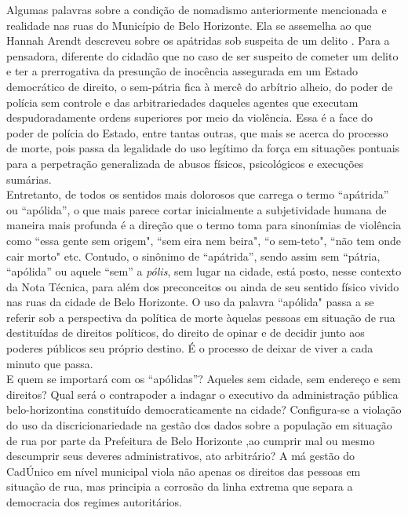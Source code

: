 \documentclass[12pt]{article}
\begin{document}
Algumas palavras sobre a condição de nomadismo anteriormente mencionada e realidade nas ruas do Município de Belo Horizonte. Ela se assemelha ao que Hannah Arendt descreveu sobre os apátridas sob suspeita de um delito \citep[p.~295]{apatrida}. Para a pensadora, diferente do cidadão que no caso de ser suspeito de cometer um delito e ter a prerrogativa da presunção de inocência assegurada em um Estado democrático de direito, o sem-pátria fica à mercê do arbítrio alheio, do poder de polícia sem controle e das arbitrariedades daqueles agentes que executam despudoradamente ordens superiores por meio da violência. Essa é a face do poder de polícia do Estado, entre tantas outras, que mais se acerca do processo de morte, pois passa da legalidade do uso legítimo da força em situações pontuais para a perpetração generalizada de abusos físicos, psicológicos e execuções sumárias.\\

Entretanto, de todos os sentidos mais dolorosos que carrega o termo ``apátrida” ou ``apólida”, o que mais parece cortar inicialmente a subjetividade humana de maneira mais profunda é a direção que o termo toma para sinonímias de violência como ``essa gente sem origem", ``sem eira nem beira", ``o sem-teto", ``não tem onde cair morto" etc. Contudo, o sinônimo de ``apátrida”, sendo assim sem ``pátria, ``apólida” ou aquele ``sem” a \emph{pólis}, sem lugar na cidade, está posto, nesse contexto da Nota Técnica, para além dos preconceitos ou ainda de seu sentido físico vivido nas ruas da cidade de Belo Horizonte. O uso da palavra ``apólida" passa a se referir sob a perspectiva da política de morte àquelas pessoas em situação de rua destituídas de direitos políticos, do direito de opinar e de decidir junto aos poderes públicos seu próprio destino. É o processo de deixar de viver a cada minuto que passa.\\ 

E quem se importará com os ``apólidas”? Aqueles sem cidade, sem endereço e sem direitos? Qual será o contrapoder a indagar o executivo da administração pública belo-horizontina constituído democraticamente na cidade? Configura-se a violação do uso da discricionariedade na gestão dos dados sobre a população em situação de rua por parte da Prefeitura de Belo Horizonte ,ao cumprir mal ou mesmo descumprir seus deveres administrativos, ato arbitrário? A má gestão do CadÚnico em nível municipal viola não apenas os direitos das pessoas em situação de rua, mas principia a corrosão da linha extrema que separa a democracia dos regimes autoritários.\\
\end{document}
